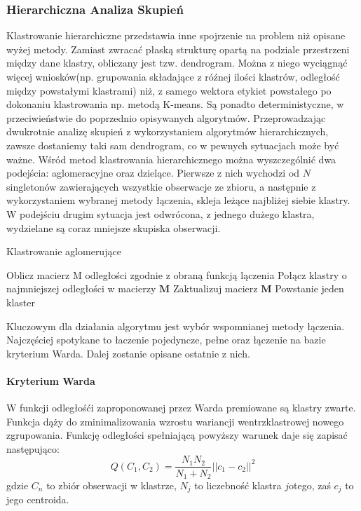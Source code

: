 \documentclass{article}
\begin{document}
\subsubsection{Hierarchiczna Analiza Skupień}
Klastrowanie hierarchiczne przedstawia inne spojrzenie na problem niż opisane wyżej metody. Zamiast zwracać płaską strukturę opartą na podziale przestrzeni między dane klastry, obliczany jest tzw. dendrogram. 
Można z niego wyciągnąć więcej wniosków(np. grupowania składające z róźnej ilości klastrów, odległość między powstałymi klastrami)  niż, z samego wektora etykiet powstałego po dokonaniu klastrowania np. metodą K-means.
Są ponadto deterministyczne, w przeciwieństwie do poprzednio opisywanych algorytmów.
Przeprowadzając dwukrotnie analizę skupień z wykorzystaniem algorytmów hierarchicznych, zawsze dostaniemy taki sam dendrogram, co w pewnych sytuacjach może być ważne.
Wśród metod klastrowania hierarchicznego można wyszczególnić dwa podejścia: aglomeracyjne oraz dzielące.
Pierwsze z nich wychodzi od $N$ singletonów zawierających wszystkie obserwacje ze zbioru, a następnie z wykorzystaniem wybranej metody łączenia, skleja leżące najbliżej siebie klastry. 
W podejściu drugim sytuacja jest odwrócona, z jednego dużego klastra, wydzielane są coraz mniejsze skupiska obserwacji\citep{Jain1988}.


\begin{algorithm}
\label{agglomerative}
\caption{Klastrowanie aglomerujące}
\begin{algorithmic}[1]
\STATE Oblicz macierz M odległości zgodnie z obraną funkcją lączenia
\REPEAT
\STATE Połącz klastry o najmniejszej odległości w macierzy $\textbf{M}$ 
\STATE Zaktualizuj macierz $\textbf{M}$ 
\UNTIL Powstanie jeden klaster
\end{algorithmic}
\end{algorithm}


Kluczowym dla działania algorytmu jest wybór wspomnianej metody łączenia.
Najczęściej spotykane to łaczenie pojedyncze, pełne oraz łączenie na bazie kryterium Warda. 
Dalej zostanie opisane ostatnie z nich.


\paragraph{Kryterium Warda}
W funkcji odległośći zaproponowanej przez Warda premiowane są klastry zwarte.
Funkcja dąży do zminimalizowania wzrostu wariancji wentrzklastrowej nowego zgrupowania.
Funkcję odległości spełniającą powyższy warunek daje się zapisać następująco:
\[ Q(C_1, C_2) = \frac{N_1N_2}{N_1 + N_2}||c_1 - c_2||^2 \]
gdzie $C_n$ to zbiór obserwacji w klastrze, $N_j$ to liczebność klastra $j$otego, zaś $c_j$ to jego centroida.
\end{document}
